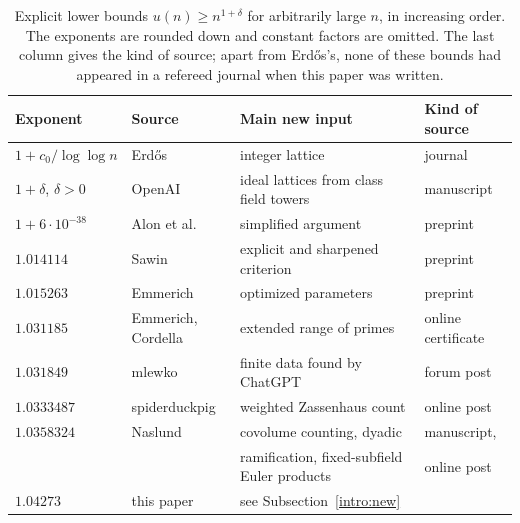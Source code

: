 \begin{table}[htbp]
\centering
\caption{Explicit lower bounds $u(n)\ge n^{1+\delta}$ for arbitrarily
large $n$, in increasing order. The exponents are rounded down and
constant factors are omitted. The last column gives the kind of source;
apart from Erd\H{o}s's, none of these bounds had appeared in a refereed
journal when this paper was written.}
\label{intro:table-bounds}
\small
\begin{tabular}{@{}llll@{}}
\toprule
Exponent & Source & Main new input & Kind of source\\
\midrule
$1+c_0/\log\log n$ & Erd\H{o}s \cite{Erdos1946} & integer lattice & journal\\
$1+\delta$, $\delta>0$ & OpenAI \cite{OpenAI2026} & ideal lattices from class field towers & manuscript\\
$1+6\cdot10^{-38}$ & Alon et al.\ \cite{Alon2026} & simplified argument & preprint\\
$1.014114$ & Sawin \cite{Sawin2026} & explicit and sharpened criterion & preprint\\
$1.015263$ & Emmerich \cite{Emmerich2026} & optimized parameters & preprint\\
$1.031185$ & Emmerich, Cordella \cite{EmmerichCordella2026} & extended range of primes & online certificate\\
$1.031849$ & mlewko \cite{ErdosProblems90} & finite data found by ChatGPT & forum post\\
$1.0333487$ & spiderduckpig \cite{SpiderduckpigMO2026} & weighted Zassenhaus count & online post\\
$1.0358324$ & Naslund \cite{Naslund0358,NaslundMO2026} & covolume counting, dyadic & manuscript,\\
 & & ramification, fixed-subfield Euler products & online post\\
$1.04273$ & this paper & see Subsection~\ref{intro:new} & \\
\bottomrule
\end{tabular}
\end{table}

